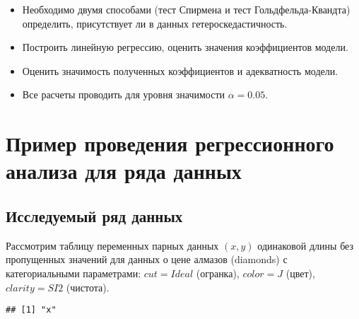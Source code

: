 \documentclass[
]{article}
\begin{document}
\begin{itemize}
\item
  Необходимо двумя способами (тест Спирмена и тест Гольдфельда-Квандта)
  определить, присутствует ли в данных гетероскедастичность.
\item
  Построить линейную регрессию, оценить значения коэффициентов модели.
\item
  Оценить значимость полученных коэффициентов и адекватность модели.
\item
  Все расчеты проводить для уровня значимости \(\alpha = 0.05\).
\end{itemize}

\hypertarget{ux43fux440ux438ux43cux435ux440-ux43fux440ux43eux432ux435ux434ux435ux43dux438ux44f-ux440ux435ux433ux440ux435ux441ux441ux438ux43eux43dux43dux43eux433ux43e-ux430ux43dux430ux43bux438ux437ux430-ux434ux43bux44f-ux440ux44fux434ux430-ux434ux430ux43dux43dux44bux445}{%
\section{\texorpdfstring{\textbf{Пример проведения регрессионного
анализа для ряда
данных}}{Пример проведения регрессионного анализа для ряда данных}}\label{ux43fux440ux438ux43cux435ux440-ux43fux440ux43eux432ux435ux434ux435ux43dux438ux44f-ux440ux435ux433ux440ux435ux441ux441ux438ux43eux43dux43dux43eux433ux43e-ux430ux43dux430ux43bux438ux437ux430-ux434ux43bux44f-ux440ux44fux434ux430-ux434ux430ux43dux43dux44bux445}}

\hypertarget{ux438ux441ux441ux43bux435ux434ux443ux435ux43cux44bux439-ux440ux44fux434-ux434ux430ux43dux43dux44bux445}{%
\subsection{\texorpdfstring{\textbf{Исследуемый ряд
данных}}{Исследуемый ряд данных}}\label{ux438ux441ux441ux43bux435ux434ux443ux435ux43cux44bux439-ux440ux44fux434-ux434ux430ux43dux43dux44bux445}}

Рассмотрим таблицу переменных парных данных \((x, y)\) одинаковой длины
без пропущенных значений для данных о цене алмазов (diamonds) с
категориальными параметрами: \(cut = Ideal\) (огранка), \(color = J\)
(цвет), \(clarity = SI2\) (чистота).

\begin{verbatim}
## [1] "x"
\end{verbatim}
\end{document}
